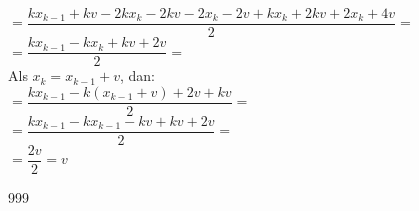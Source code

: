 \documentclass[a4paper]{article}
\begin{document}
$=\dfrac{kx_{k-1}+kv-2kx_k-2kv-2x_k-2v+kx_k+2kv+2x_k+4v}{2}=$\\

$=\dfrac{kx_{k-1}-kx_k+kv+2v}{2}=$\\

Als $x_k=x_{k-1}+v$, dan:\\

$=\dfrac{kx_{k-1}-k(x_{k-1}+v)+2v+kv}{2}=$\\

$=\dfrac{kx_{k-1}-kx_{k-1}-kv+kv+2v}{2}=$\\

$=\dfrac{2v}{2}=v$\\

								


\begin{thebibliography}{999}
\end{thebibliography}
\end{document}
